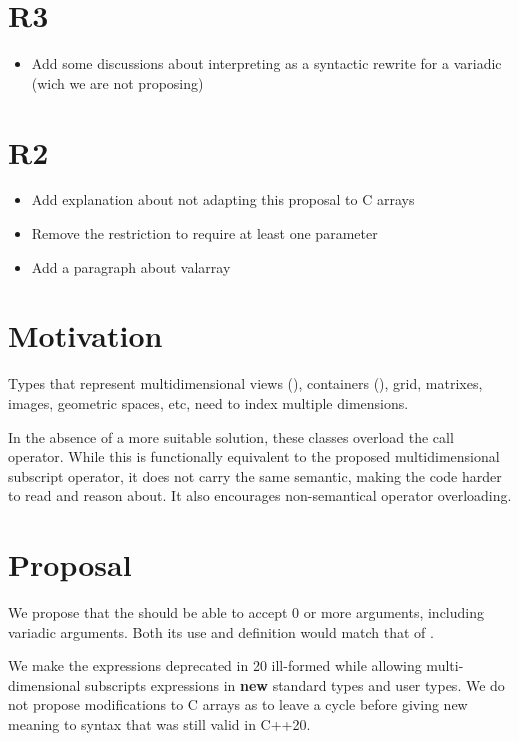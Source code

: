 \documentclass{wg21}
\begin{document}
\section{R3}

\begin{itemize}
\item Add some discussions about interpreting  as a syntactic rewrite for a variadic  (wich we are not proposing)
\end{itemize}


\section{R2}

\begin{itemize}
    \item Add explanation about not adapting this proposal to C arrays
    \item Remove the restriction to require at least one parameter
    \item Add a paragraph about valarray
\end{itemize}

\section{Motivation}

Types that represent multidimensional views (), containers (), grid, matrixes, images,
geometric spaces, etc, need to index multiple dimensions.

In the absence of a more suitable solution, these classes overload the call operator.
While this is functionally equivalent to the proposed multidimensional subscript operator, it does not carry the same semantic, making the code harder to read and reason about. It also encourages non-semantical operator overloading.

\section{Proposal}
We propose that the  should be able to accept 0 or more arguments, including variadic arguments.
Both its use and definition would match that of .

We make the expressions deprecated in 20 ill-formed while allowing multi-dimensional subscripts expressions in \textbf{new} standard types
and user types. We do not propose modifications to C arrays as to leave a cycle before giving new meaning to syntax that was still valid in C++20.
\end{document}
